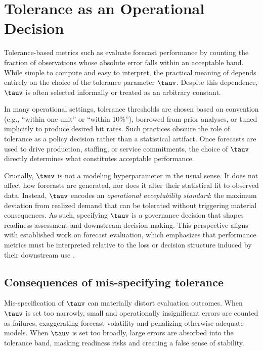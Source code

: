 \section{Tolerance as an Operational Decision}
\label{sec:operational_problem}

Tolerance-based metrics such as \HRtau{} evaluate forecast performance by
counting the fraction of observations whose absolute error falls within an
acceptable band.
While simple to compute and easy to interpret, the practical meaning of
\HRtau{} depends entirely on the choice of the tolerance parameter $\tauv$.
Despite this dependence, $\tauv$ is often selected informally or treated as an
arbitrary constant.

In many operational settings, tolerance thresholds are chosen based on
convention (e.g., ``within one unit'' or ``within 10\%''), borrowed from prior
analyses, or tuned implicitly to produce desired hit rates.
Such practices obscure the role of tolerance as a policy decision rather than a
statistical artifact.
Once forecasts are used to drive production, staffing, or service commitments,
the choice of $\tauv$ directly determines what constitutes acceptable
performance.

Crucially, $\tauv$ is not a modeling hyperparameter in the usual sense.
It does not affect how forecasts are generated, nor does it alter their
statistical fit to observed data.
Instead, $\tauv$ encodes an \emph{operational acceptability standard}: the maximum
deviation from realized demand that can be tolerated without triggering
material consequences.
As such, specifying $\tauv$ is a governance decision that shapes readiness
assessment and downstream decision-making.
This perspective aligns with established work on forecast evaluation, which
emphasizes that performance metrics must be interpreted relative to the loss or
decision structure induced by their downstream use \citep{gneiting2011}.

\subsection{Consequences of mis-specifying tolerance}
\label{subsec:mis_specification}

Mis-specification of $\tauv$ can materially distort evaluation outcomes.
When $\tauv$ is set too narrowly, small and operationally insignificant errors
are counted as failures, exaggerating forecast volatility and penalizing
otherwise adequate models.
When $\tauv$ is set too broadly, large errors are absorbed into the tolerance
band, masking readiness risks and creating a false sense of stability.

